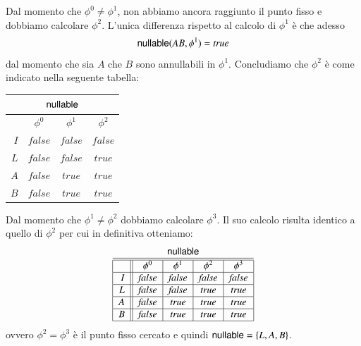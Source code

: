 %
Dal momento che $\phi^0\not=\phi^1$, non abbiamo ancora raggiunto il punto
fisso e dobbiamo calcolare $\phi^2$. L'unica differenza rispetto al calcolo
di $\phi^1$ \`e che adesso
\[
  \mathsf{nullable}(AB,\phi^1)=\mathit{true}
\]
dal momento che sia $A$ che $B$ sono annullabili in $\phi^1$. Concludiamo che
$\phi^2$ \`e come indicato nella seguente tabella:
%
\begin{center}
\begin{tabular}{|r||c|c|c|}
\multicolumn{4}{c}{$\mathsf{nullable}$}\\\hline\hline
 & $\phi^0$ & $\phi^1$ & $\phi^2$ \\\hline
$I$ & $\mathit{false}$ & $\mathit{false}$ & $\mathit{false}$ \\\hline
$L$ & $\mathit{false}$ & $\mathit{false}$ & $\mathit{true}$ \\\hline
$A$ & $\mathit{false}$ & $\mathit{true}$ & $\mathit{true}$ \\\hline
$B$ & $\mathit{false}$ & $\mathit{true}$ & $\mathit{true}$ \\\hline
\end{tabular}
\end{center}
%
Dal momento che $\phi^1\not=\phi^2$ dobbiamo calcolare $\phi^3$. Il suo calcolo
risulta identico a quello di $\phi^2$ per cui in definitiva otteniamo:
%
\begin{equation}\label{tab:grammar_lists_nullable}
\begin{tabular}{|r||c|c|c|c|}
\multicolumn{5}{c}{$\nullable$}\\\hline\hline
 & $\phi^0$ & $\phi^1$ & $\phi^2$ & $\phi^3$ \\\hline
$I$ & $\mathit{false}$ & $\mathit{false}$ & $\mathit{false}$ & $\mathit{false}$\\\hline
$L$ & $\mathit{false}$ & $\mathit{false}$ & $\mathit{true}$ & $\mathit{true}$\\\hline
$A$ & $\mathit{false}$ & $\mathit{true}$ & $\mathit{true}$ & $\mathit{true}$\\\hline
$B$ & $\mathit{false}$ & $\mathit{true}$ & $\mathit{true}$ & $\mathit{true}$\\\hline
\end{tabular}
\end{equation}
%
ovvero $\phi^2=\phi^3$ \`e il punto fisso cercato e quindi
$\mathsf{nullable}=\{L,A,B\}$.
%

